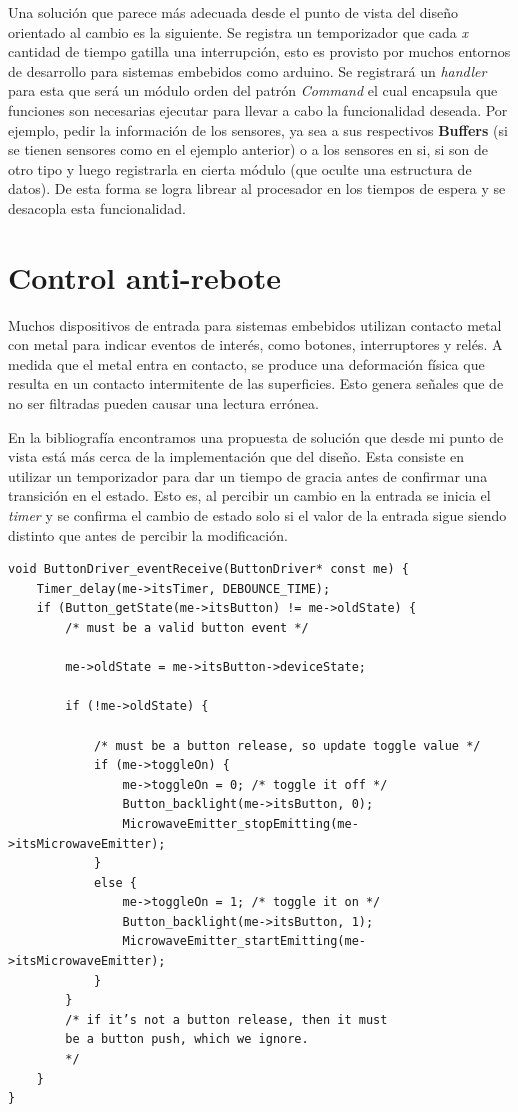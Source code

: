 Una solución que parece más adecuada desde el punto de vista del diseño orientado al cambio es la siguiente. Se registra un temporizador que cada \textit{x} cantidad de tiempo gatilla una interrupción, esto es provisto por muchos entornos de desarrollo para sistemas embebidos como \gls{arduino}.
Se registrará un \textit{handler} para esta que será un módulo orden del patrón \textit{Command} el cual encapsula que funciones son necesarias ejecutar para llevar a cabo la funcionalidad deseada. Por ejemplo, pedir la información de los sensores, ya sea a sus respectivos \textbf{Buffers} (si se tienen sensores como en el ejemplo anterior) o a los sensores en si, si son de otro tipo y luego registrarla en cierta módulo (que oculte una estructura de datos). De esta forma se logra librear al procesador en los tiempos de espera y se desacopla esta funcionalidad.



\section{Control anti-rebote}
Muchos dispositivos de entrada para sistemas embebidos utilizan contacto metal con metal para indicar eventos de interés, como botones, interruptores y relés. A medida que el metal entra en contacto, se produce una deformación física que resulta en un contacto intermitente de las superficies. Esto genera señales que de no ser filtradas pueden causar una lectura errónea. 

En la bibliografía encontramos una propuesta de solución que desde mi punto de vista está más cerca de la implementación que del diseño. Esta consiste en utilizar un temporizador para dar un tiempo de gracia antes de confirmar una transición en el estado. Esto es, al percibir un cambio en la entrada se inicia el \textit{timer} y se confirma el cambio de estado solo si el valor de la entrada sigue siendo distinto que antes de percibir la modificación. 

\begin{lstlisting}[caption=Código ejemplo]
void ButtonDriver_eventReceive(ButtonDriver* const me) {
    Timer_delay(me->itsTimer, DEBOUNCE_TIME);
    if (Button_getState(me->itsButton) != me->oldState) {
        /* must be a valid button event */
        
        me->oldState = me->itsButton->deviceState;
        
        if (!me->oldState) {
            
            /* must be a button release, so update toggle value */
            if (me->toggleOn) {
                me->toggleOn = 0; /* toggle it off */
                Button_backlight(me->itsButton, 0);
                MicrowaveEmitter_stopEmitting(me->itsMicrowaveEmitter);
            }
            else {
                me->toggleOn = 1; /* toggle it on */
                Button_backlight(me->itsButton, 1);
                MicrowaveEmitter_startEmitting(me->itsMicrowaveEmitter);
            }
        }
        /* if it’s not a button release, then it must
        be a button push, which we ignore.
        */
    }
}
\end{lstlisting}

